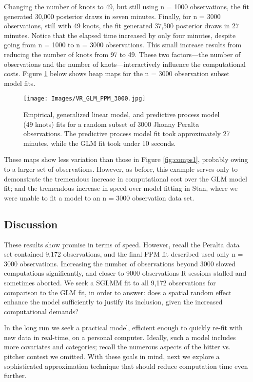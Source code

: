 Changing the number of knots to 49, but still using n = 1000 observations, the fit generated 30,000 posterior draws in seven minutes. Finally, for n = 3000 observations, still with 49 knots, the fit generated 37,500 posterior draws in 27 minutes. Notice that the elapsed time increased by only four minutes, despite going from n = 1000 to n = 3000 observations. This small increase results from reducing the number of knots from 97 to 49. These two factors---the number of observations and the number of knots---interactively influence the computational costs. Figure \ref{fig:comps2} below shows heap maps for the n = 3000 observation subset model fits. 
  \begin{figure}[H]
	\centering 
	\texttt{[image: Images/VR\_GLM\_PPM\_3000.jpg]}
	\caption{Empirical, generalized linear model, and predictive process model (49 knots) fits for a random subset of 3000 Jhonny Peralta observations. The predictive process model fit took approximately 27 minutes, while the GLM fit took under 10 seconds.}
	\label{fig:comps2}
	\end{figure}
These maps show less variation than those in Figure \ref{fig:comps1}, probably owing to a larger set of observations. However, as before, this example serves only to demonstrate the tremendous increase in computational cost over the GLM model fit; and the tremendous increase in speed over model fitting in Stan, where we were unable to fit a model to an n = 3000 observation data set. 

\subsection{Discussion}
These results show promise in terms of speed. However, recall the Peralta data set contained 9,172 observations, and the final PPM fit described used only n = 3000 observations. Increasing the number of observations beyond 3000 slowed computations significantly, and closer to 9000 observations R sessions stalled and sometimes aborted. We seek a SGLMM fit to all 9,172 observations for comparison to the GLM fit, in order to answer: does a spatial random effect enhance the model sufficiently to justify its inclusion, given the increased computational demands?  

In the long run we seek a practical model, efficient enough to quickly re-fit with new data in real-time, on a personal computer. Ideally, such a model includes more covariates and categories; recall the numerous aspects of the hitter vs. pitcher contest we omitted. With these goals in mind, next we explore a sophisticated approximation technique that should reduce computation time even further.

